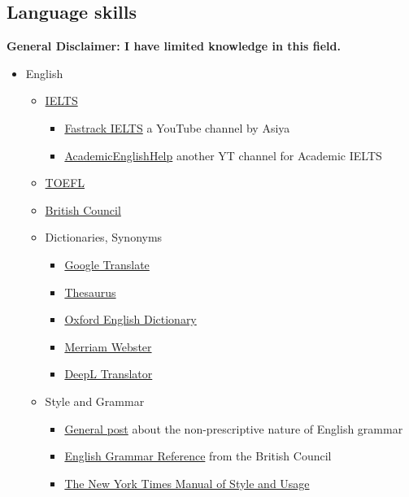 \documentclass{article}
\begin{document}
\subsection{Language skills}
\textbf{General Disclaimer: I have limited knowledge in this field.}

\begin{itemize}
    \item English
    \begin{itemize}
        \item \href{https://www.ielts.org/}{IELTS}
        \begin{itemize}
            \item \href{https://www.youtube.com/channel/UCRA4UOCBRgv2w9b59pDMyvQ}{Fastrack IELTS} a YouTube channel by Asiya
            \item \href{https://www.youtube.com/channel/UCQ3A7Dnyz1_Fxaa5BCzAPMA}{AcademicEnglishHelp} another YT channel for Academic IELTS
        \end{itemize}
        \item \href{https://www.ets.org/toefl}{TOEFL}
        \item \href{https://learnenglish.britishcouncil.org/}{British Council}
        \item Dictionaries, Synonyms
        \begin{itemize}
            \item \href{https://translate.google.com/}{Google Translate}
            \item \href{https://www.thesaurus.com/}{Thesaurus}
            \item \href{https://www.oed.com/}{Oxford English Dictionary}
            \item \href{https://www.merriam-webster.com/}{Merriam Webster}
            \item \href{https://www.deepl.com/translator}{DeepL Translator}
        \end{itemize}
        \item Style and Grammar
        \begin{itemize}
            \item \href{https://www.britishcouncil.org/voices-magazine/what-are-correct-rules-english-grammar}{General post} about the non-prescriptive nature of English grammar
            \item \href{https://learnenglish.britishcouncil.org/grammar/english-grammar-reference}{English Grammar Reference} from the British Council
            \item \href{https://www.goodreads.com/book/show/75441.The_New_York_Times_Manual_of_Style_and_Usage}{The New York Times Manual of Style and Usage}

\end{itemize}
\end{itemize}
\end{itemize}
\end{document}
